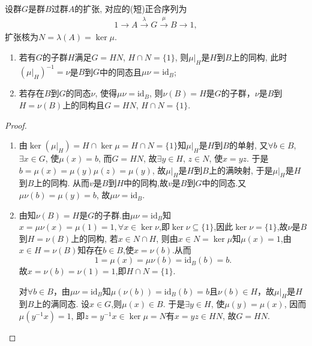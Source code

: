 \documentclass[../../main.tex]{subfiles}%
\begin{document}
\begin{theorem}\label{theorem:抽象代数--定理4.5.2}
设群$G$是群$B$过群$A$的扩张, 对应的(短)正合序列为
\begin{align*}
1\longrightarrow A \stackrel{\lambda}{\longrightarrow} G \stackrel{\mu}{\longrightarrow} B\longrightarrow 1,
\end{align*}
扩张核为$N = \lambda(A) = \ker\mu$.
\begin{enumerate}[(1)]
\item 若有$G$的子群$H$满足$G = HN$, $H\cap N = \{1\}$, 则$\mu|_H$是$H$到$B$上的同构, 此时$(\mu|_H)^{-1} = \nu$是$B$到$G$中的同态且$\mu\nu = \text{id}_B$;
\item 若存在$B$到$G$的同态$\nu$, 使得$\mu\nu = \text{id}_B$, 则$\nu(B) = H$是$G$的子群，$\nu$是$B$到$H = \nu(B)$上的同构且$G = HN$, $H\cap N = \{1\}$.
\end{enumerate}
\end{theorem}
\begin{proof}
\begin{enumerate}[(1)]
\item 由$\ker(\mu|_H) = H\cap\ker\mu = H\cap N = \{1\}$知$\mu|_H$是$H$到$B$的单射, 又$\forall b\in B$, $\exists x\in G$, 使$\mu(x) = b$, 而$G = HN$, 故$\exists y\in H$, $z\in N$, 使$x = yz$. 于是$b = \mu(x) = \mu(y)\mu(z) = \mu(y)$, 故$\mu|_H$是$H$到$B$上的满映射, 于是$\mu|_H$是$H$到$B$上的同构. 从而$v$是$B$到$H$中的同构,故$v$是$B$到$G$中的同态.又$\mu\nu(b) = \mu(y) = b$, 故$\mu\nu = \text{id}_B$.
\item 由知$\nu(B)=H$是$G$的子群.由$\mu\nu = \text{id}_B$知$x=\mu\nu(x)=\mu(1)=1,\forall x\in \ker \nu$,即$\ker \nu\subseteq \{1\}$,因此$\ker\nu = \{1\}$,故$\nu$是$B$到$H = \nu(B)$上的同构, 若$x\in N\cap H$, 则由$x\in N=\ker \mu$知$\mu(x) = 1$,由$x\in H=\nu(B)$知存在$b\in B$,使$x=\nu(b)$.从而
$$
1=\mu \left( x \right) =\mu \nu \left( b \right) =\mathrm{id}_B\left( b \right) =b.
$$
故$x=\nu \left( b \right) =\nu \left( 1 \right) =1$,即$H\cap N = \{1\}$. 

对$\forall b \in B$，由$\mu\nu = \mathrm{id}_B$知$\mu(\nu(b)) = \mathrm{id}_B(b) = b$且$\nu(b) \in H$，故$\mu|_H$是$H$到$B$上的满同态.
设$x\in G$,则$\mu (x)\in B$. 于是$\exists y\in H$, 使$\mu(y) = \mu(x)$, 因而$\mu(y^{-1}x) = 1$, 即$z = y^{-1}x\in \ker\mu =N$有$x = yz\in HN$, 故$G = HN$.
\end{enumerate}
\end{proof}
\end{document}
